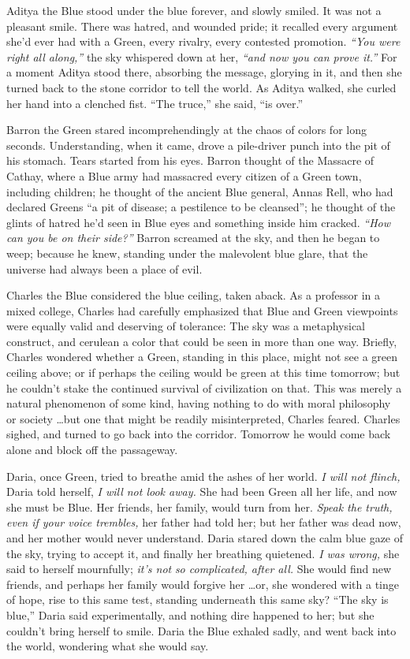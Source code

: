 {
 Aditya the Blue stood under the blue forever, and slowly smiled.
It was not a pleasant smile. There was hatred, and wounded pride; it
recalled every argument she'd ever had with a Green,
every rivalry, every contested promotion.
\textit{``You were right all
along,''} the sky whispered down at her,
\textit{``and now you can prove
it.''} For a moment Aditya stood there, absorbing the
message, glorying in it, and then she turned back to the stone corridor
to tell the world. As Aditya walked, she curled her hand into a
clenched fist. ``The truce,'' she
said, ``is over.''}

{
 Barron the Green stared incomprehendingly at the chaos of colors
for long seconds. Understanding, when it came, drove a pile-driver
punch into the pit of his stomach. Tears started from his eyes. Barron
thought of the Massacre of Cathay, where a Blue army had massacred
every citizen of a Green town, including children; he thought of the
ancient Blue general, Annas Rell, who had declared Greens
``a pit of disease; a pestilence to be
cleansed''; he thought of the glints of hatred
he'd seen in Blue eyes and something inside him
cracked. \textit{``How can you be on their
side?''} Barron screamed at the sky, and then he
began to weep; because he knew, standing under the malevolent blue
glare, that the universe had always been a place of evil.}

{
 Charles the Blue considered the blue ceiling, taken aback. As a
professor in a mixed college, Charles had carefully emphasized that
Blue and Green viewpoints were equally valid and deserving of
tolerance: The sky was a metaphysical construct, and cerulean a color
that could be seen in more than one way. Briefly, Charles wondered
whether a Green, standing in this place, might not see a green ceiling
above; or if perhaps the ceiling would be green at this time tomorrow;
but he couldn't stake the continued survival of
civilization on that. This was merely a natural phenomenon of some
kind, having nothing to do with moral philosophy or society \ldots but
one that might be readily misinterpreted, Charles feared. Charles
sighed, and turned to go back into the corridor. Tomorrow he would come
back alone and block off the passageway.}

{
 Daria, once Green, tried to breathe amid the ashes of her world.
\textit{I will not flinch,} Daria told herself, \textit{I will not look
away.} She had been Green all her life, and now she must be Blue. Her
friends, her family, would turn from her. \textit{Speak the truth, even
if your voice trembles,} her father had told her; but her father was
dead now, and her mother would never understand. Daria stared down the
calm blue gaze of the sky, trying to accept it, and finally her
breathing quietened. \textit{I was wrong,} she said to herself
mournfully; \textit{it's not }\textit{so complicated,
after all.} She would find new friends, and perhaps her family would
forgive her \ldots or, she wondered with a tinge of hope, rise to this
same test, standing underneath this same sky? ``The
sky is blue,'' Daria said experimentally, and nothing
dire happened to her; but she couldn't bring herself to
smile. Daria the Blue exhaled sadly, and went back into the world,
wondering what she would say.}

